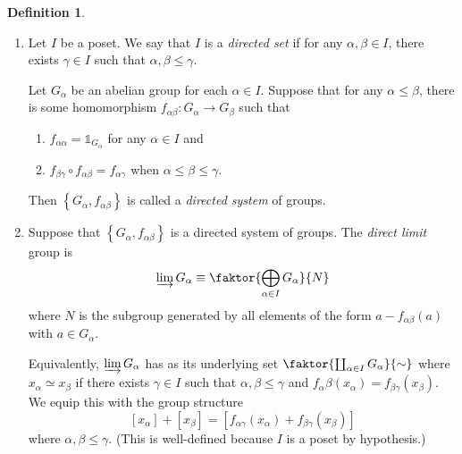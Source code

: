 \documentclass[10pt,letterpaper,cm]{nupset}
\theoremstyle{definition}
\newtheorem{definition}{Definition}[subsection]
\theoremstyle{theorem}
\theoremstyle{remark}
\newcommand{\1}{\mathbb{1}}
\newcommand{\0}{\vec 0}
\begin{document}
\begin{definition} $ $
\begin{enumerate}
\item Let $I$ be a poset. We say that $I$ is a \textit{directed set} if for any $\alpha, \beta \in I$, there exists $\gamma \in I$ such that $\alpha, \beta \leq \gamma$. 

Let $G_{\alpha}$ be an abelian group for each $\alpha \in I$. Suppose that for any $\alpha \leq \beta$, there is some homomorphism $f_{\alpha{\beta}} : G_{\alpha} \to G_{\beta}$ such that 
\begin{enumerate}[label=(\roman*)]
\item $f_{\alpha{\alpha}} = \1_{G_{\alpha}}$ for any $\alpha \in I$ and 
\item $f_{\beta{\gamma}}\circ f_{\alpha{\beta}} = f_{\alpha{\gamma}}$ when $\alpha \leq \beta \leq \gamma$. 
\end{enumerate}
Then $\left\{G_{\alpha}, f_{\alpha{\beta}}\right\}$ is called a \textit{directed system} of groups. 
\item Suppose that $\left\{G_{\alpha},  f_{\alpha{\beta}}\right\}$ is a directed system of groups. The \textit{direct limit} group is $$\varinjlim G_{\alpha} \equiv \faktor{\bigoplus_{\alpha \in I}G_{\alpha}}{N}$$ where $N$ is the subgroup generated by all elements of the form $a-f_{\alpha{\beta}}(a)$ with $a\in G_{\alpha}$. 

Equivalently, $\varinjlim G_{\alpha}$ has as its underlying set $\faktor{\coprod_{\alpha \in I} G_{\alpha}}{\sim}$ where $x_{\alpha} \simeq x_{\beta}$ if there exists $\gamma \in I$ such that $\alpha, \beta \leq \gamma$ and $f_{\alpha}{\beta}(x_{\alpha}) = f_{\beta{\gamma}}(x_{\beta})$. We equip this with the group structure $$\left[x_{\alpha}\right] +\left[x_{\beta}\right] = \left[f_{\alpha{\gamma}}(x_{\alpha}) + f_{\beta{\gamma}}(x_{\beta})\right]$$ where $\alpha, \beta \leq \gamma$. (This is well-defined because $I$ is a poset by hypothesis.)
\end{enumerate}
\end{definition}
\end{document}
